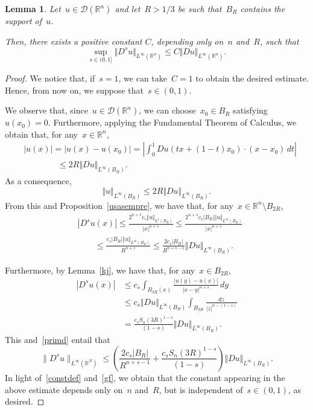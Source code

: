 \documentclass[11pt,hyp,]{nyjm}
\numberwithin{equation}{section}
\newcommand{\R}{\mathbb{R}}
\newtheorem{lemma}[theorem]{Lemma}
\theoremstyle{remark}
\renewcommand{\leq}{\leqslant}
\renewcommand{\le}{\leqslant}
\begin{document}
			\begin{lemma}\label{drday}
				Let~$u \in \mathcal{D}(\R^n)$ and let~$R>1/3$ be such that~$B_{R}$ contains the support of~$u$. 
				
				Then, there exists a positive constant $C$, depending only on~$n$ and~$R$, such that
				\[\sup_{s \in (0,1]} \Vert D^s u \Vert_{L^{\infty}(\R^n)} \leq C \Vert Du \Vert_{L^{\infty}(\R^n)}.\]
			\end{lemma}
			
			\begin{proof}
We notice that, if~$s=1$, we can take~$C=1$ to obtain the desired estimate. Hence, from now on, we suppose that~$s \in (0,1)$.
				
				We observe that, since~$u \in \mathcal{D}(\R^n)$, we can choose~$x_0 \in B_{R}$ satisfying~$u(x_0)=0$. Furthermore, applying the Fundamental Theorem of Calculus, we obtain that, for any~$x \in \R^n$,
				\begin{equation*}\begin{split}&
				|u(x)| =|u(x)-u(x_0)|= \left|
				\int_0^1 Du(tx + (1-t)x_0) \cdot  (x-x_0) \, dt \right|\\&\qquad\qquad\leq 2R \Vert Du \Vert_{L^{\infty}(B_{R})}.	\end{split}
				\end{equation*}
				As a consequence,
$$				\Vert u \Vert_{L^{\infty}(B_{R})} \leq 2R \Vert Du \Vert_{L^{\infty}(B_{R})}.
$$
{F}rom this and Proposition~\ref{usasempre}, we have that, for any~$x \in \R^n \setminus B_{2R} $,
\begin{equation}\begin{split}\label{primd}
&|D^s u (x) | \leq \frac{2^{n+s} c_s \Vert u \Vert_{L^{1}(B_{R})}} {|x|^{n+s}} 
\leq  \frac{2^{n+s} c_s |B_{R}| \Vert u \Vert_{L^{\infty}(B_{R})} } {|x|^{n+s}}   \\
&\qquad\leq  \frac{c_s|B_{R}| \Vert u \Vert_{L^{\infty}(B_{R})} } {{R}^{n+s}} 
\leq 
\frac{2c_s|B_{R}|  } {{R}^{n+s-1}}  \Vert Du \Vert_{L^{\infty}(B_{R})}.\end{split}\end{equation} 

Furthermore, by Lemma~\ref{kj}, we have that,
for any~$x \in B_{2R}$,
\begin{equation*}\begin{split}
|D^s u (x)| &\leq c_s \int_{B_{3R}(x)} \frac{|u(y)-u(x)|}{|x-y|^{n+s}} \, dy \\&\leq c_s \Vert Du \Vert_{L^{\infty}(B_{R})} \int_{B_{3R}} \frac{dz}{|z|^{n-(1-s)}}\\&
=  \frac{c_s S_n (3R)^{1-s}}{(1-s)}   \Vert Du \Vert_{L^{\infty}(B_{R})} . \end{split}\end{equation*} 
This and~\eqref{primd} entail that
\begin{equation*}
\|D^s u \|_{L^\infty(\R^N)}\le\left( \frac{2c_s|B_{R}|  } {{R}^{n+s-1}}+ \frac{c_s S_n (3R)^{1-s}}{(1-s)}   \right) \Vert Du \Vert_{L^{\infty}(B_{R})}.
\end{equation*}
In light of~\eqref{constdef} and~\eqref{gf}, we obtain that the constant appearing
in the above estimate depends only on~$n$ and~$R$, but is independent of~$s\in(0,1)$, as desired.
\end{proof}
			
\end{document}
